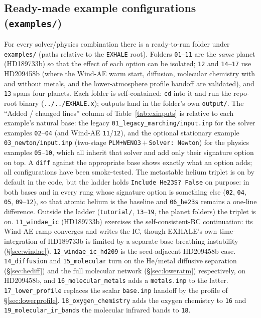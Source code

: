 \documentclass[english,a4paper]{my_memo}
\begin{document}
\subsection{Ready-made example configurations (\texttt{examples/})}
\label{sec:exinputs}
For every solver/physics combination there is a ready-to-run folder under
\texttt{examples/} (paths relative to the \texttt{EXHALE} root). Folders
\texttt{01}--\texttt{11} are the \emph{same} planet (HD189733b) so that the
effect of each option can be isolated; \texttt{12} and
\texttt{14}--\texttt{17} use HD209458b (where the Wind-AE warm start,
diffusion, molecular chemistry with and without metals, and the
lower-atmosphere profile handoff are validated),
and \texttt{13} spans four planets. Each folder is
self-contained: \texttt{cd} into it and run the repo-root binary
(\texttt{../../EXHALE.x}); outputs land in the folder's own \texttt{output/}.
The ``Added / changed lines'' column of Table~\ref{tab:exinputs} is relative
to each example's natural base: the legacy
\texttt{01\_legacy\_marching/input.inp} for the solver examples
\texttt{02}--\texttt{04} (and Wind-AE \texttt{11}/\texttt{12}), and the
optional stationary example \texttt{03\_newton/input.inp} (two-stage
\texttt{PLM+WENO3}\,$+$\,\texttt{Solver: Newton}) for the physics examples
\texttt{05}--\texttt{10}, which all inherit that solver and add only their
signature option on top. A \texttt{diff} against the appropriate base shows
exactly what an option adds; all configurations have been smoke-tested.
The metastable helium triplet is on by default in the code, but the ladder
holds \texttt{Include He23S? False} on purpose: in both bases and in every
rung whose signature option is something else (\texttt{02}, \texttt{04},
\texttt{05}, \texttt{09}--\texttt{12}), so that atomic helium is the
baseline and \texttt{06\_he23s} remains a one-line difference. Outside the
ladder (\texttt{tutorial/}, \texttt{13}--\texttt{19}, the planet folders) the
triplet is on.
\texttt{11\_windae\_ic} (HD189733b) exercises the self-consistent-BC
continuation: its Wind-AE ramp converges and writes the IC, though EXHALE's own
time-integration of HD189733b is limited by a separate base-breathing
instability (\S\ref{sec:windae}). \texttt{12\_windae\_ic\_hd209} is the
seed-adjacent HD209458b case. \texttt{14\_diffusion} and \texttt{15\_molecular}
turn on the He/metal diffusive separation (\S\ref{sec:hediff}) and the full
molecular network (\S\ref{sec:loweratm}) respectively, on HD209458b, and
\texttt{16\_molecular\_metals} adds a \texttt{metals.inp} to the latter. \texttt{17\_lower\_profile} replaces the scalar
\texttt{base.inp} handoff by the profile of \S\ref{sec:lowerprofile}.
\texttt{18\_oxygen\_chemistry} adds the oxygen chemistry to \texttt{16} and
\texttt{19\_molecular\_ir\_bands} the molecular infrared bands to \texttt{18}.
\end{document}
